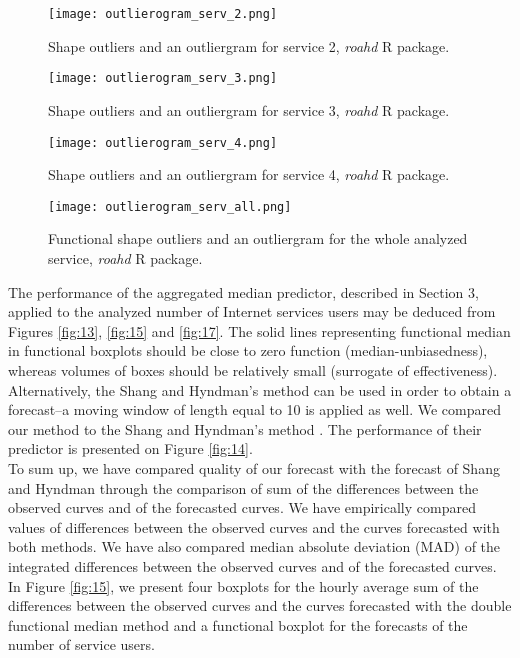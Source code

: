 \documentclass[12pt,a4paper]{article}
\numberwithin{equation}{section}
\begin{document}
\begin{figure*}
\texttt{[image: outlierogram\_serv\_2.png]}
\caption{Shape outliers and an outliergram for  service 2, \textit{roahd} R package.}
\label{fig:9}
\end{figure*}
\begin{figure*}
\texttt{[image: outlierogram\_serv\_3.png]}
\caption{Shape outliers and an outliergram for  service 3, \textit{roahd} R package.}
\label{fig:10}
\end{figure*}
\begin{figure*}
\texttt{[image: outlierogram\_serv\_4.png]}
\caption{Shape outliers and an outliergram for  service 4, \textit{roahd} R package.}
\label{fig:11}
\end{figure*}
\begin{figure*}
\texttt{[image: outlierogram\_serv\_all.png]}
\caption{Functional shape outliers and an outliergram for the whole analyzed service, \textit{roahd} R package.}
\label{fig:12}
\end{figure*}
The performance of the aggregated median predictor, described in Section 3, applied to the analyzed number of Internet services users may be deduced from Figures \ref{fig:13}, \ref{fig:15} and \ref{fig:17}. The solid lines representing functional median in functional boxplots should be close to zero function (median-unbiasedness), whereas volumes of boxes should be relatively small (surrogate of effectiveness).
\\ Alternatively, the Shang and Hyndman's method can be used in order to obtain a forecast--a moving window of length equal to 10 is applied as well. 
We compared our method to the Shang and Hyndman's method \cite{Shang}. The performance of their predictor is presented on Figure \ref{fig:14}.\\ 
To sum up, we have compared quality of our forecast with the forecast of Shang and Hyndman \cite{Shang} through the comparison of sum of the differences between the observed curves and of the forecasted curves. We have empirically compared values of differences between the observed curves and the curves forecasted with both methods. We have also compared median absolute deviation (MAD) of the integrated differences between the observed curves and of the forecasted curves.
\\ In Figure \ref{fig:15}, we present four boxplots for the hourly average sum of the differences between the observed curves and the curves forecasted with the double functional median method and a functional boxplot for the forecasts of the number of service users.
\end{document}
